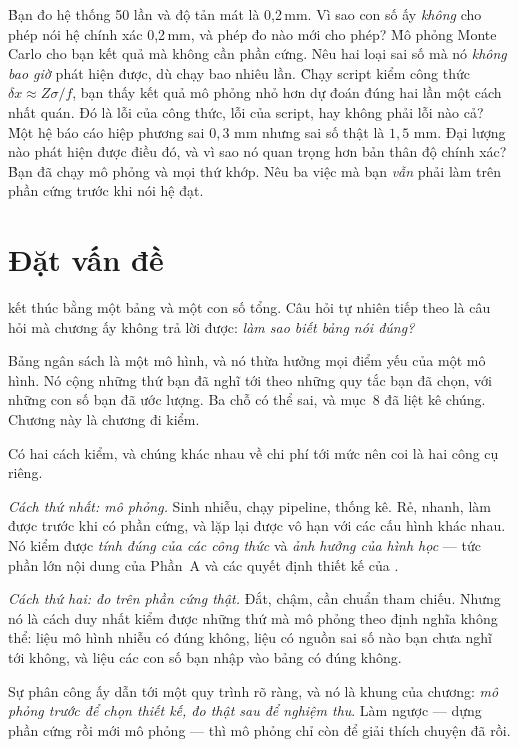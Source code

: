 \documentclass[../../marker.tex]{subfiles}
\begin{document}
\begin{khoigoi}
\h{Bạn đo hệ thống 50 lần và độ tản mát là 0,2\,mm. Vì sao con số ấy \emph{không} cho phép nói hệ chính xác 0,2\,mm, và phép đo nào mới cho phép?}
\h{Mô phỏng Monte Carlo cho bạn kết quả mà không cần phần cứng. Nêu hai loại sai số mà nó \emph{không bao giờ} phát hiện được, dù chạy bao nhiêu lần.}
\h{Chạy script kiểm công thức \(\delta x \approx Z\sigma/f\), bạn thấy kết quả mô phỏng nhỏ hơn dự đoán đúng hai lần một cách nhất quán. Đó là lỗi của công thức, lỗi của script, hay không phải lỗi nào cả?}
\h{Một hệ báo cáo hiệp phương sai \(0{,}3\) mm nhưng sai số thật là \(1{,}5\) mm. Đại lượng nào phát hiện được điều đó, và vì sao nó quan trọng hơn bản thân độ chính xác?}
\h{Bạn đã chạy mô phỏng và mọi thứ khớp. Nêu ba việc mà bạn \emph{vẫn} phải làm trên phần cứng trước khi nói hệ đạt.}
\end{khoigoi}

\section{Đặt vấn đề}

 kết thúc bằng một bảng và một con số tổng. Câu hỏi tự nhiên tiếp theo là câu hỏi mà chương ấy không trả lời được: \emph{làm sao biết bảng nói đúng?}

Bảng ngân sách là một mô hình, và nó thừa hưởng mọi điểm yếu của một mô hình. Nó cộng những thứ bạn đã nghĩ tới theo những quy tắc bạn đã chọn, với những con số bạn đã ước lượng. Ba chỗ có thể sai, và  mục~8 đã liệt kê chúng. Chương này là chương đi kiểm.

Có hai cách kiểm, và chúng khác nhau về chi phí tới mức nên coi là hai công cụ riêng.

\emph{Cách thứ nhất: mô phỏng.} Sinh nhiễu, chạy pipeline, thống kê. Rẻ, nhanh, làm được trước khi có phần cứng, và lặp lại được vô hạn với các cấu hình khác nhau. Nó kiểm được \emph{tính đúng của các công thức} và \emph{ảnh hưởng của hình học} --- tức phần lớn nội dung của Phần~A và các quyết định thiết kế của .

\emph{Cách thứ hai: đo trên phần cứng thật.} Đắt, chậm, cần chuẩn tham chiếu. Nhưng nó là cách duy nhất kiểm được những thứ mà mô phỏng theo định nghĩa không thể: liệu mô hình nhiễu có đúng không, liệu có nguồn sai số nào bạn chưa nghĩ tới không, và liệu các con số bạn nhập vào bảng có đúng không.

Sự phân công ấy dẫn tới một quy trình rõ ràng, và nó là khung của chương: \emph{mô phỏng trước để chọn thiết kế, đo thật sau để nghiệm thu}. Làm ngược --- dựng phần cứng rồi mới mô phỏng --- thì mô phỏng chỉ còn để giải thích chuyện đã rồi.
\end{document}

